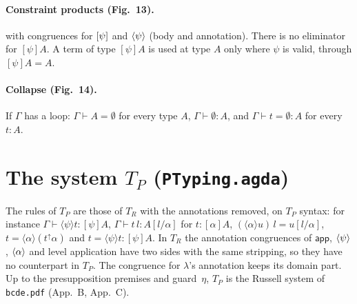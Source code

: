 \documentclass[10pt]{article}
\newcommand{\pre}[1]{{\color{gray}#1}}  %
\newcommand{\new}[1]{{\color{blue!70!black}#1}}  %
\newcommand{\lam}{\lambda}
\newcommand{\app}{\mathsf{app}}
\newcommand{\ty}{\ \mathsf{type}}
\newcommand{\valid}{\ \mathsf{valid}}
\newcommand{\TR}{T_R}
\newcommand{\TP}{T_P}
\newcommand{\Emp}{\emptyset}
\newcommand{\grd}[2]{[#1]#2}
\newcommand{\glam}[2]{\langle #1\rangle #2}
\newcommand{\lpi}[1]{[\alpha]#1}
\newcommand{\llam}[1]{\langle\alpha\rangle #1}
\newcommand{\up}{{\uparrow}}
\newcommand{\agda}[1]{\texttt{#1}}
\theoremstyle{remark}
\begin{document}
\paragraph{Constraint products (Fig.~13).}
with congruences for $\grd\psi$ and $\glam\psi$ (body and annotation).
There is no eliminator for $\grd\psi A$.  A term of type $\grd\psi A$ is used
at type $A$ only where $\psi$ is valid, through $\grd\psi A=A$.

\paragraph{Collapse (Fig.~14).}  If $\Gamma$ has a loop:
$\Gamma\vdash A=\Emp$ for every type $A$, $\Gamma\vdash\Emp:A$, and
$\Gamma\vdash t=\Emp:A$ for every $t:A$.

\section{The system $\TP$ (\agda{PTyping.agda})}

The rules of $\TP$ are those of $\TR$ with the annotations removed, on $\TP$
syntax: for instance $\Gamma\vdash\glam\psi t:\grd\psi A$,
$\Gamma\vdash t\,l:A[l/\alpha]$ for $t:\lpi A$, $(\llam u)\,l=u[l/\alpha]$,
$t=\llam(t^\up\alpha)$ and \new{$t=\glam\psi t:\grd\psi A$}.  In $\TR$ the
annotation congruences of $\app$, $\glam\psi$, $\llam$ and level application
have two sides with the same stripping, so they have no counterpart in $\TP$.
The congruence for $\lam$'s annotation keeps its domain part.  Up to the
presupposition premises and guard~$\eta$, $\TP$ is the Russell system of
\texttt{bcde.pdf} (App.~B, App.~C).
\end{document}
